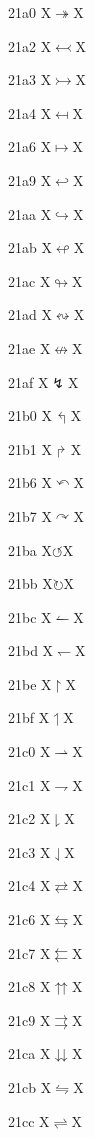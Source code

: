 \documentclass[11pt]{article}
\begin{document}
21a0 X{\ensuremath{\twoheadrightarrow}}X

21a2 X{\ensuremath{\leftarrowtail}}X

21a3 X{\ensuremath{\rightarrowtail}}X

21a4 X{\ensuremath{\mapsfrom}}X

21a6 X{\ensuremath{\mapsto}}X

21a9 X{\ensuremath{\hookleftarrow}}X

21aa X{\ensuremath{\hookrightarrow}}X

21ab X{\ensuremath{\looparrowleft}}X

21ac X{\ensuremath{\looparrowright}}X

21ad X{\ensuremath{\leftrightsquigarrow}}X

21ae X{\ensuremath{\nleftrightarrow}}X

21af X{\ensuremath{\lightning}}X

21b0 X{\ensuremath{\Lsh}}X

21b1 X{\ensuremath{\Rsh}}X

21b6 X{\ensuremath{\curvearrowleft}}X

21b7 X{\ensuremath{\curvearrowright}}X

21ba X{\ensuremath{\circlearrowleft}}X

21bb X{\ensuremath{\circlearrowright}}X

21bc X{\ensuremath{\leftharpoonup}}X

21bd X{\ensuremath{\leftharpoondown}}X

21be X{\ensuremath{\upharpoonright}}X

21bf X{\ensuremath{\upharpoonleft}}X

21c0 X{\ensuremath{\rightharpoonup}}X

21c1 X{\ensuremath{\rightharpoondown}}X

21c2 X{\ensuremath{\downharpoonright}}X

21c3 X{\ensuremath{\downharpoonleft}}X

21c4 X{\ensuremath{\rightleftarrows}}X

21c6 X{\ensuremath{\leftrightarrows}}X

21c7 X{\ensuremath{\leftleftarrows}}X

21c8 X{\ensuremath{\upuparrows}}X

21c9 X{\ensuremath{\rightrightarrows}}X

21ca X{\ensuremath{\downdownarrows}}X

21cb X{\ensuremath{\leftrightharpoons}}X

21cc X{\ensuremath{\rightleftharpoons}}X
\end{document}
